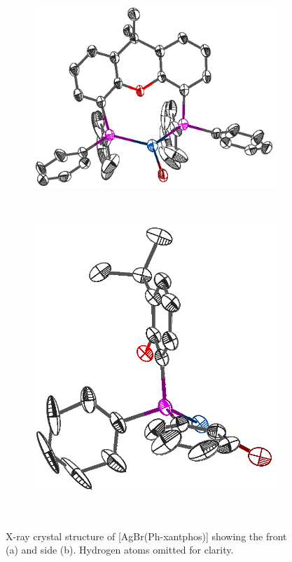 \begin{figure}[htbp]
\centering
\begin{subfigure}[b]{0.58\textwidth}
	\centering
	\includegraphics[width=\textwidth]{../Othercrystals/xantsAgBr.eps}	
	\caption{}
\end{subfigure}
~
\begin{subfigure}[b]{0.36\textwidth}
	\centering
	\includegraphics[width=\textwidth]{../Othercrystals/xantsAgBrside.eps}
	\caption{}
\end{subfigure}
\\
\caption[X-ray crystal structure of AgBr(Ph-xantphos)]{X-ray crystal structure of [AgBr(Ph-xantphos)] showing the front (a) and side (b).\cite{Kaltzoglou2007}  Hydrogen atoms omitted for clarity.}\label{crystal:AgPhxantphosBr}
\end{figure}

